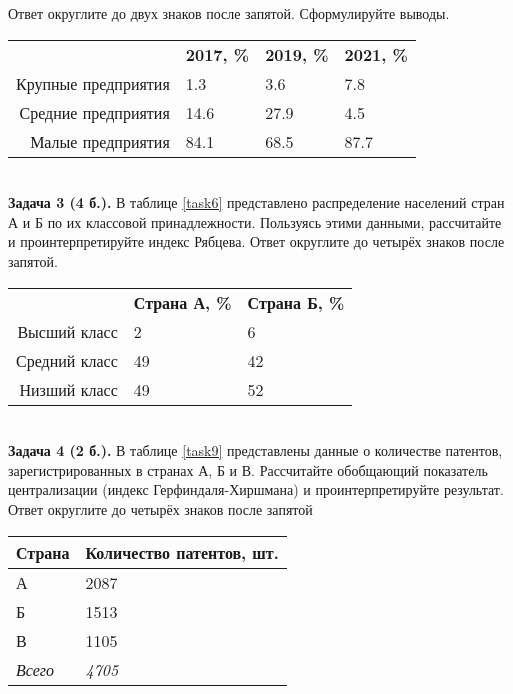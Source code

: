 \documentclass{article}
\begin{document}
Ответ округлите до двух знаков после запятой. Сформулируйте выводы.\\

\begin{minipage}{\textwidth}
\centering
\begin{tabularx}{0.8\textwidth}{rYYY}
\toprule
 & \textbf{2017, \%} & \textbf{2019, \%} & \textbf{2021, \%} \\
\cmidrule(lr){2-2}\cmidrule(lr){3-3}\cmidrule(lr){4-4}
Крупные предприятия & 1.3 & 3.6 & 7.8 \\

Средние предприятия & 14.6 & 27.9 & 4.5 \\

Малые предприятия & 84.1 & 68.5 & 87.7 \\
\bottomrule
\end{tabularx}
\label{task2}
\end{minipage} \\[35pt]

\textbf{Задача 3 (4 б.).} В таблице \ref{task6} представлено распределение населений стран А и Б по их классовой принадлежности. Пользуясь этими данными, рассчитайте и проинтерпретируйте индекс Рябцева. Ответ округлите до четырёх знаков после запятой.\\

\begin{minipage}{\textwidth}
\centering
\begin{tabularx}{0.7\textwidth}{rYY}
\toprule
 & \textbf{Страна А, \%} & \textbf{Страна Б, \%} \\
\cmidrule(lr){2-2}\cmidrule(lr){3-3}
Высший класс & 2 & 6 \\

Средний класс & 49 & 42 \\

Низший класс & 49 & 52 \\
\bottomrule
\end{tabularx}
\label{task6}
\end{minipage} \\[35pt]

\textbf{Задача 4 (2 б.).} В таблице \ref{task9} представлены данные о количестве патентов, зарегистрированных в странах А, Б и В. Рассчитайте обобщающий показатель централизации (индекс Герфиндаля-Хиршмана) и проинтерпретируйте результат. Ответ округлите до четырёх знаков после запятой\\

\begin{minipage}{\textwidth}
\centering
\begin{tabularx}{0.4\textwidth}{YY}
\toprule
\textbf{Страна} & \textbf{Количество патентов, шт.} \\
\midrule
А & 2087 \\

Б & 1513 \\

В & 1105 \\
\addlinespace
\textit{Всего} & \textit{4705} \\
\bottomrule
\end{tabularx}
\label{task9}
\end{minipage} \\[35pt]
\end{document}

